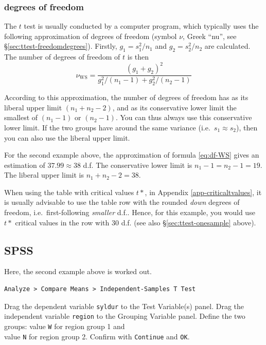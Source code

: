 \documentclass[
]{book}
\begin{document}
\hypertarget{freedomdegrees}{%
\subsubsection{degrees of freedom}\label{freedomdegrees}}

The \(t\) test is usually conducted by a computer program, which typically uses the following approximation of degrees of freedom (symbol \(\nu\), Greek ``nu'', see §\ref{sec:ttest-freedomdegrees}).
Firstly, \(g_1=s^2_1/n_1\)
and \(g_2=s^2_2/n_2\) are calculated. The number of degrees of freedom of \(t\) is then
\begin{equation}
  \label{eq:df-WS}
  \nu_\textrm{WS} = 
        \frac {(g_1+g_2)^2} {g^2_1/(n_1-1) + g^2_2/(n_2-1)}
\end{equation}

According to this approximation, the number of degrees of freedom has as its liberal
upper limit \((n_1+n_2-2)\), and as its conservative lower limit the smallest
of \((n_1-1)\) or \((n_2-1)\). You can thus always use this conservative
lower limit. If the two groups have around the same variance
(i.e.~\(s_1 \approx s_2\)), then you can also use the liberal upper
limit.

For the second example above, the approximation of formula
\eqref{eq:df-WS} gives
an estimation of \(37.99 \approx 38\) d.f. The conservative lower limit is
\(n_1-1 = n_2-1 = 19\). The liberal upper limit is \(n_1+n_2 -2 = 38\).

When using the table with critical values \(t*\), in
Appendix \ref{app-criticaltvalues}, it is usually advisable to use the table row
with the rounded \emph{down} degrees of freedom, i.e.~first-following \emph{smaller} d.f..
Hence, for this example, you would use \(t*\) critical values in the row with \(30\) d.f.
(see also §\ref{sec:ttest-onesample} above).

\hypertarget{sec:SPSS-ttest-unpaired}{%
\subsection{SPSS}\label{sec:SPSS-ttest-unpaired}}

Here, the second example above is worked out.

\begin{verbatim}
Analyze > Compare Means > Independent-Samples T Test
\end{verbatim}

Drag the dependent variable \texttt{syldur} to the Test Variable(s) panel.
Drag the independent variable \texttt{region} to the Grouping
Variable panel. Define the two groups: value \texttt{W} for region group 1 and\\
value \texttt{N} for region group 2. Confirm with \texttt{Continue} and \texttt{OK}.
\end{document}

